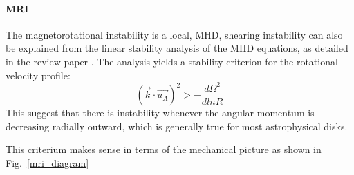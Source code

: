 \documentclass[iop,revtex4]{emulateapj}
\begin{document}
\paragraph*{\rm{\textbf{\acf{MRI}}\\}}
The magnetorotational instability is a local, \ac{MHD}, shearing instability can also be explained from the linear stability analysis of the \ac{MHD} equations, as detailed in the review paper \citep{Balbus:1998A}. The analysis yields a stability criterion for the rotational velocity profile: 
\begin{equation}
(\vec{k}\cdot\vec{u_A})^2> -\frac{d\Omega^2}{d ln R}
\end{equation}
This suggest that there is instability whenever the angular momentum is decreasing radially outward, which is generally true for most astrophysical disks.
\par This criterium makes sense in terms of the mechanical picture as shown in Fig.~\ref{mri_diagram}
\end{document}
